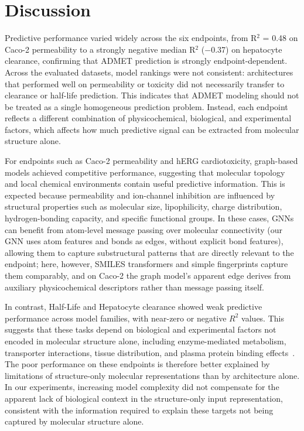 \documentclass[journal]{IEEEtran}
\begin{document}
\section{Discussion}
\label{sec:discussion}

Predictive performance varied widely across the six endpoints, from R$^2$ = 0.48 on Caco-2 permeability to a strongly negative median R$^2$ ($-$0.37) on hepatocyte clearance, confirming that ADMET prediction is strongly endpoint-dependent.
Across the evaluated datasets, model rankings were not consistent: architectures that performed well on permeability or toxicity did not necessarily transfer to clearance or half-life prediction.
This indicates that ADMET modeling should not be treated as a single homogeneous prediction problem.
Instead, each endpoint reflects a different combination of physicochemical, biological, and experimental factors, which affects how much predictive signal can be extracted from molecular structure alone.

For endpoints such as Caco-2 permeability and hERG cardiotoxicity, graph-based models achieved competitive performance, suggesting that molecular topology and local chemical environments contain useful predictive information.
This is expected because permeability and ion-channel inhibition are influenced by structural properties such as molecular size, lipophilicity, charge distribution, hydrogen-bonding capacity, and specific functional groups.
In these cases, GNNs can benefit from atom-level message passing over molecular connectivity (our GNN uses atom features and bonds as edges, without explicit bond features), allowing them to capture substructural patterns that are directly relevant to the endpoint; here, however, SMILES transformers and simple fingerprints capture them comparably, and on Caco-2 the graph model's apparent edge derives from auxiliary physicochemical descriptors rather than message passing itself.

In contrast, Half-Life and Hepatocyte clearance showed weak predictive performance across model families, with near-zero or negative \(R^2\) values.
This suggests that these tasks depend on biological and experimental factors not encoded in molecular structure alone, including enzyme-mediated metabolism, transporter interactions, tissue distribution, and plasma protein binding effects~\cite{li2019dmpk,lai2022dmpk,bohnert2013proteinbinding}.
The poor performance on these endpoints is therefore better explained by limitations of structure-only molecular representations than by architecture alone.
In our experiments, increasing model complexity did not compensate for the apparent lack of biological context in the structure-only input representation, consistent with the information required to explain these targets not being captured by molecular structure alone.
\end{document}
